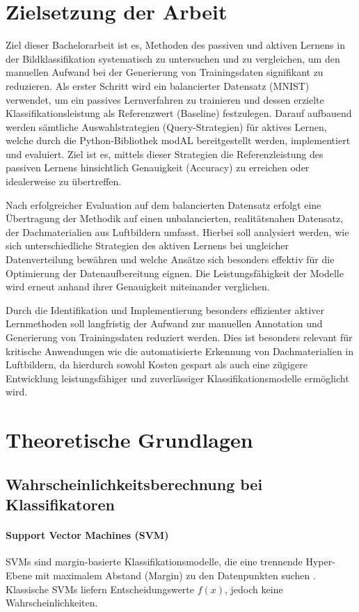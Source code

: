 \documentclass{article}
\begin{document}
\section{Zielsetzung der Arbeit}


Ziel dieser Bachelorarbeit ist es, Methoden des passiven und aktiven Lernens in der Bildklassifikation systematisch zu untersuchen und zu vergleichen, um den manuellen Aufwand bei der Generierung von Trainingsdaten signifikant zu reduzieren. Als erster Schritt wird ein balancierter Datensatz (MNIST) verwendet, um ein passives Lernverfahren zu trainieren und dessen erzielte Klassifikationsleistung als Referenzwert (Baseline) festzulegen. Darauf aufbauend werden sämtliche Auswahlstrategien (Query-Strategien) für aktives Lernen, welche durch die Python-Bibliothek modAL bereitgestellt werden, implementiert und evaluiert. Ziel ist es, mittels dieser Strategien die Referenzleistung des passiven Lernens hinsichtlich Genauigkeit (Accuracy) zu erreichen oder idealerweise zu übertreffen.

Nach erfolgreicher Evaluation auf dem balancierten Datensatz erfolgt eine Übertragung der Methodik auf einen unbalancierten, realitätsnahen Datensatz, der Dachmaterialien aus Luftbildern umfasst. Hierbei soll analysiert werden, wie sich unterschiedliche Strategien des aktiven Lernens bei ungleicher Datenverteilung bewähren und welche Ansätze sich besonders effektiv für die Optimierung der Datenaufbereitung eignen. Die Leistungsfähigkeit der Modelle wird erneut anhand ihrer Genauigkeit miteinander verglichen.

Durch die Identifikation und Implementierung besonders effizienter aktiver Lernmethoden soll langfristig der Aufwand zur manuellen Annotation und Generierung von Trainingsdaten reduziert werden. Dies ist besonders relevant für kritische Anwendungen wie die automatisierte Erkennung von Dachmaterialien in Luftbildern, da hierdurch sowohl Kosten gespart als auch eine zügigere Entwicklung leistungsfähiger und zuverlässiger Klassifikationsmodelle ermöglicht wird.

\section{Theoretische Grundlagen}
\subsection{Wahrscheinlichkeitsberechnung bei Klassifikatoren}

\paragraph{Support Vector Machines (SVM)}
SVMs sind margin-basierte Klassifikationsmodelle, die eine trennende Hyper-Ebene mit maximalem Abstand (Margin) zu den Datenpunkten suchen \cite{cortes1995support}. Klassische SVMs liefern Entscheidungswerte \(f(x)\), jedoch keine Wahrscheinlichkeiten. 
\end{document}
